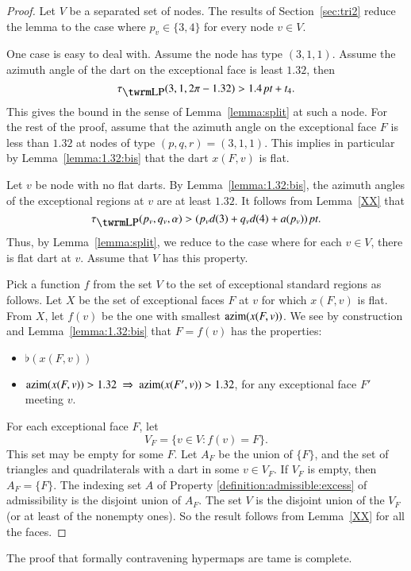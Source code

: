 \begin{proof}  Let $V$ be a separated set of nodes.
The results of Section~\ref{sec:tri2} reduce the lemma to the case
where $p_v\in\{3,4\}$ for every node $v\in V$.


One case is easy to deal with.  Assume the node has type $(3,1,1)$.
 Assume the azimuth angle of the dart on the exceptional face is
least $1.32$, then
    \begin{equation}
    \tauLP(3,1,2\pi-1.32)>1.4\,\pt + t_4.
    \label{eqn:tau1.32}
    \end{equation}
This gives the bound in the sense of Lemma~\ref{lemma:split} at such
a node. For the rest of the proof, assume that the azimuth angle on
the exceptional face $F$ is less than $1.32$ at nodes of type
$(p,q,r)=(3,1,1)$. This implies in particular by
Lemma~\ref{lemma:1.32:bis} that the dart $x(F,v)$ is flat.

Let $v$ be node with no flat darts.   By Lemma~\ref{lemma:1.32:bis},
the azimuth angles of the
exceptional regions at $v$ are at least $1.32$.   It follows%
from Lemma~\ref{XX} that
    \begin{equation}
    \tauLP(p_v,q_v,\alpha) > ( p_v d(3) + q_v d(4) + a(p_v))\,\pt.
    \label{eqn:tau-alpha}
    \end{equation}
Thus, by Lemma~\ref{lemma:split}, we reduce to the case where for
each $v\in V$,  there is flat dart at $v$.  Assume that $V$ has this
property.

Pick a function $f$ from the set $V$ to the set of exceptional
standard regions as follows. Let $X$ be the set of exceptional faces
$F$ at $v$ for which $x(F,v)$ is flat.  From $X$, let $f(v)$ be the
one with smallest ${\operatorname{azim}}(x(F,v))$.  We see by construction and
Lemma~\ref{lemma:1.32:bis} that $F = f(v)$ has the properties:
    \begin{itemize}
        \item $\flat(x(F,v))$
        \item $\azim(x(F,v)) > 1.32\ \Rightarrow\ \azim(x(F',v)) >
        1.32$, for any exceptional face $F'$ meeting $v$.
    \end{itemize}

For each exceptional face $F$, let
    $$V_F = \{ v\in V : f(v) = F\}.$$  This set may be empty for
some $F$.  Let $A_F$ be the union of $\{F\}$, and the set of
triangles and quadrilaterals with a dart in some $v\in V_F$.  If
$V_F$ is empty, then $A_F =\{F\}$.  The indexing set $A$ of Property
\ref{definition:admissible:excess} of admissibility is the disjoint
union of $A_F$.  The set $V$ is the disjoint union of the $V_F$ (or
at least of the nonempty ones). So the result follows from
Lemma~\ref{XX} for all the faces.
\end{proof}



The proof that formally contravening hypermaps are tame is complete.
